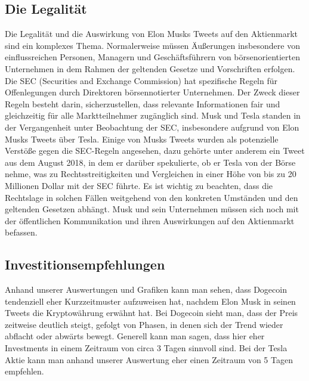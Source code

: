 \documentclass{article}
\begin{document}
\subsection{Die Legalität} \label{Die Legalität}
Die Legalität und die Auswirkung von Elon Musks Tweets auf den Aktienmarkt sind ein komplexes Thema. Normalerweise müssen Äußerungen insbesondere von einflussreichen Personen, Managern und Geschäftsführern von börsenorientierten Unternehmen in dem Rahmen der geltenden Gesetze und Vorschriften erfolgen.
Die SEC (Securities and Exchange Commission) hat spezifische Regeln für Offenlegungen durch Direktoren börsennotierter Unternehmen. Der Zweck dieser Regeln besteht darin, sicherzustellen,
dass relevante Informationen fair und gleichzeitig für alle Marktteilnehmer zugänglich sind. Musk und Tesla standen in der Vergangenheit unter Beobachtung der SEC, insbesondere aufgrund von Elon Musks Tweets über Tesla. Einige von Musks Tweets wurden als potenzielle Verstöße gegen die SEC-Regeln angesehen, dazu gehörte unter anderem ein Tweet aus dem August 2018, in dem er darüber spekulierte, ob er Tesla von der Börse nehme, was zu Rechtsstreitigkeiten und Vergleichen in einer Höhe von bis zu 20 Millionen Dollar mit der SEC führte. Es ist wichtig zu beachten, dass die Rechtslage in solchen Fällen weitgehend von den konkreten Umständen und den geltenden Gesetzen abhängt. Musk und sein Unternehmen müssen sich noch mit der öffentlichen Kommunikation und ihren Auswirkungen auf den Aktienmarkt befassen.

\subsection{Investitionsempfehlungen} \label{Investitionsempfehlungen}
Anhand unserer Auswertungen und Grafiken kann man sehen, dass Dogecoin tendenziell eher Kurzzeitmuster aufzuweisen hat, nachdem Elon Musk in seinen Tweets die Kryptowährung erwähnt hat. Bei Dogecoin sieht man, dass der Preis zeitweise deutlich steigt, gefolgt von Phasen, in denen sich der Trend wieder abflacht oder abwärts bewegt. Generell kann man sagen, dass hier eher Investments in einem Zeitraum von circa 3 Tagen sinnvoll sind. Bei der Tesla Aktie kann man anhand unserer Auswertung eher einen Zeitraum von 5 Tagen empfehlen.
\end{document}
